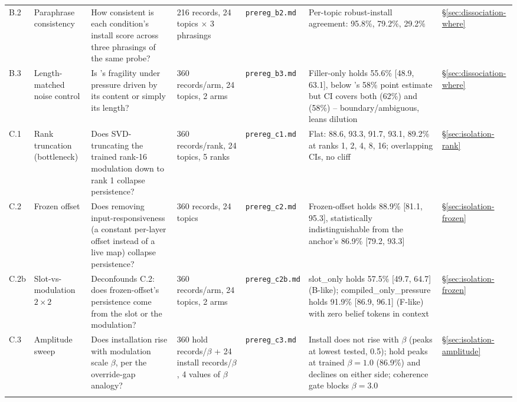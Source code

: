 \begin{longtable}{@{}p{}p{}p{}p{}p{}p{}p{}@{}}
\label{app:exp-b2}B.2 &
Paraphrase consistency &
How consistent is each condition's install score across three phrasings of the same
probe? &
216 records, 24 topics \(\times\) 3 phrasings &
\texttt{prereg\_b2.md} &
Per-topic robust-install agreement: \condB{} 95.8\%, \condF{} 79.2\%, \condC{} 29.2\% &
\S\ref{sec:dissociation-where} \\
\addlinespace

\label{app:exp-b3}B.3 &
Length-matched noise control &
Is \condB{}'s fragility under pressure driven by its content or simply its length? &
360 records/arm, 24 topics, 2 arms &
\texttt{prereg\_b3.md} &
Filler-only holds 55.6\% [48.9, 63.1], below \condB{}'s 58\% point estimate but CI
covers both \condA{} (62\%) and \condB{} (58\%) -- boundary/ambiguous, leans dilution &
\S\ref{sec:dissociation-where} \\
\addlinespace

\label{app:exp-c1}C.1 &
Rank truncation (bottleneck) &
Does SVD-truncating the trained rank-16 modulation down to rank 1 collapse
persistence? &
360 records/rank, 24 topics, 5 ranks &
\texttt{prereg\_c1.md} &
Flat: 88.6, 93.3, 91.7, 93.1, 89.2\% at ranks 1, 2, 4, 8, 16; overlapping CIs, no
cliff &
\S\ref{sec:isolation-rank} \\
\addlinespace

\label{app:exp-c2}C.2 &
Frozen offset &
Does removing input-responsiveness (a constant per-layer offset instead of a live
map) collapse persistence? &
360 records, 24 topics &
\texttt{prereg\_c2.md} &
Frozen-offset holds 88.9\% [81.1, 95.3], statistically indistinguishable from
the \condF{} anchor's 86.9\% [79.2, 93.3] &
\S\ref{sec:isolation-frozen} \\
\addlinespace

\label{app:exp-c2b}C.2b &
Slot-vs-modulation \(2\times2\) &
Deconfounds C.2: does frozen-offset's persistence come from the slot or the
modulation? &
360 records/arm, 24 topics, 2 arms &
\texttt{prereg\_c2b.md} &
slot\_only holds 57.5\% [49.7, 64.7] (B-like); compiled\_only\_pressure holds 91.9\%
[86.9, 96.1] (F-like) with zero belief tokens in context &
\S\ref{sec:isolation-frozen} \\
\addlinespace

\label{app:exp-c3}C.3 &
Amplitude sweep &
Does installation rise with modulation scale \(\beta\), per the override-gap
analogy? &
360 hold records/\(\beta\) + 24 install records/\(\beta\), 4 values of \(\beta\) &
\texttt{prereg\_c3.md} &
Install does not rise with \(\beta\) (peaks at lowest tested, 0.5); hold peaks at
trained \(\beta=1.0\) (86.9\%) and declines on either side; coherence gate blocks
\(\beta=3.0\) &
\S\ref{sec:isolation-amplitude} \\
\addlinespace


\end{longtable}

